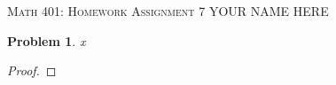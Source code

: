 \documentclass[12pt]{article}
\newtheorem{problem}{Problem}
\begin{document}
\small
\noindent \textsc{Math 401: Homework Assignment 7} \hfill YOUR NAME HERE

\normalsize
\bigskip

\setcounter{problem}{43}

\begin{problem} %
x
\end{problem}

\begin{proof}
\end{proof}
\end{document}
